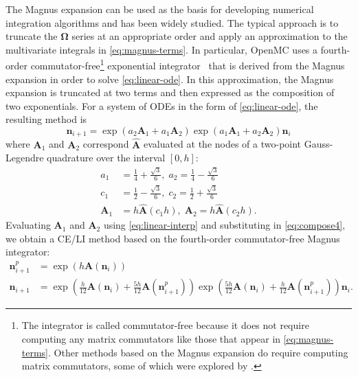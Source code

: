 \documentclass[3p,authoryear]{elsarticle}
\newcommand{\vect}[1]{\mathbf{#1}} %
\begin{document}
The Magnus expansion can be used as the basis for developing numerical
integration algorithms and has been widely studied. The typical approach is to
truncate the $\vect{\Omega}$ series at an appropriate order and apply an
approximation to the multivariate integrals in \cref{eq:magnus-terms}. In
particular, OpenMC uses a fourth-order commutator-free\footnote{The integrator
is called commutator-free because it does not require computing any matrix
commutators like those that appear in \cref{eq:magnus-terms}. Other methods
based on the Magnus expansion do require computing matrix commutators, some of
which were explored by \citet{josey2017phd}.} exponential
integrator~\citep{blanes2006anm} that is derived from the Magnus expansion in
order to solve \cref{eq:linear-ode}. In this approximation, the Magnus expansion
is truncated at two terms and then expressed as the composition of two
exponentials. For a system of ODEs in the form of \cref{eq:linear-ode}, the
resulting method is
\begin{equation}
  \label{eq:compose4}
  \vect{n}_{i+1} = \exp (a_2 \vect{A}_1 + a_1 \vect{A}_2)
  \exp (a_1 \vect{A}_1 + a_2 \vect{A}_2) \vect{n}_i
\end{equation}
where $\vect{A}_1$ and $\vect{A}_2$ correspond $\hat{\vect{A}}$ evaluated at the
nodes of a two-point Gauss-Legendre quadrature over the interval $[0,h]$:
\begin{equation}
  \begin{split}
    a_1 &= \frac{1}{4} + \frac{\sqrt{3}}{6}, \; a_2 = \frac{1}{4} - \frac{\sqrt{3}}{6} \\
    c_1 &= \frac{1}{2} - \frac{\sqrt{3}}{6}, \; c_2 = \frac{1}{2} + \frac{\sqrt{3}}{6} \\
    \vect{A}_1 &= h\hat{\vect{A}}\left ( c_1 h\right ), \; \vect{A}_2 = h\hat{\vect{A}}\left ( c_2 h\right ).
  \end{split}
\end{equation}
Evaluating $\vect{A}_1$ and $\vect{A}_2$ using \cref{eq:linear-interp} and
substituting in \cref{eq:compose4}, we obtain a CE/LI method based on the
fourth-order commutator-free Magnus integrator:
\begin{equation}
  \label{eq:celi-cfq4}
  \begin{split}
  \vect{n}_{i+1}^p &= \exp \left ( h \vect{A}(\vect{n}_i ) \right ) \\
  \vect{n}_{i+1} &= \exp \left( \frac{h}{12} \vect{A}(\vect{n}_i) +
    \frac{5h}{12} \vect{A}(\vect{n}_{i+1}^p) \right)
  \exp \left( \frac{5h}{12} \vect{A}(\vect{n}_i) +
  \frac{h}{12} \vect{A}(\vect{n}_{i+1}^p) \right) \vect{n}_i.
  \end{split}
\end{equation}
\end{document}
